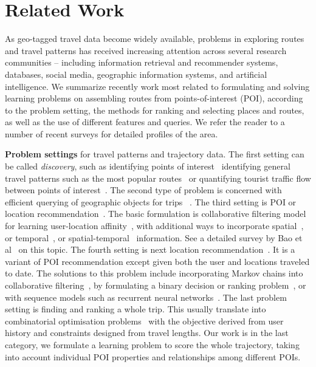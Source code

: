 
\section{Related Work}
\label{sec:relatedwork}

As geo-tagged travel data become widely available, problems in exploring routes and travel patterns has received increasing attention across several research communities -- including information retrieval and recommender systems, databases, social media, geographic information systems, and artificial intelligence. 
We summarize recently work most related to formulating and solving learning problems on assembling routes 
from points-of-interest (POI), according to the problem setting, the methods for ranking and selecting places and routes, as well as the use of different features and queries. We refer the reader to a number of recent surveys\cite{bao2015recommendations,zheng2015trajectory,zheng2014urban} for detailed profiles of the area.

{\bf Problem settings} for travel patterns and trajectory data. 
The first setting can be called {\em discovery}, such as identifying points of interest~\cite{zheng2009mining,li2015instagram} identifying general travel patterns such as the most popular routes~\cite{lu2010photo2trip} or 
quantifying tourist traffic flow between points of interest~\cite{zheng2012patterns}. 
The second type of problem is concerned with efficient querying of geographic objects for trips ~\cite{hashem2015efficient}. 
The third setting is POI or location recommendation~\cite{bao2015recommendations,yin2015joint}. The basic formulation is collaborative filtering model for learning user-location affinity~\cite{shi2011personalized}, with additional ways to incorporate spatial~\cite{lian2014geomf,liu2014exploiting}, or temporal~\cite{yuan2013timeaware,hsieh2014mining,gao2013temporal}, or spatial-temporal~\cite{yuan2014graph} information. See a detailed survey by Bao et al~\cite{bao2015recommendations} on this topic. 
The fourth setting is next location recommendation~\cite{ijcai13,aaai16,baraglia2013learnext,zhang2015location}. It is a variant of POI recommendation except given both the user and locations traveled to date. The solutions to this problem include incorporating Markov chains into collaborative filtering~\cite{fpmc10,ijcai13,zhang2015location}, by formulating a binary decision or ranking problem~\cite{baraglia2013learnext}, or with sequence models such as recurrent neural networks~\cite{aaai16}. 
The last problem setting is finding and ranking a whole trip. This usually translate into combinatorial optimisation problems~\cite{ijcai15,lu2012personalized} with the objective derived from user history and constraints designed from travel lengths. 
Our work is in the last category, we formulate a learning problem to score the whole trajectory, taking into account individual POI properties and relationships among different POIs. 

